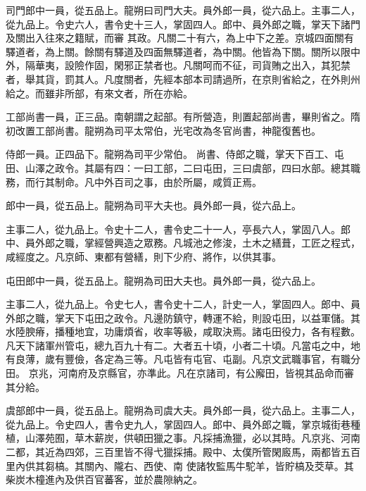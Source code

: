 \begin{pinyinscope}
 司門郎中一員，從五品上。龍朔曰司門大夫。員外郎一員，從六品上。主事二人，從九品上。令史六人，書令史十三人，掌固四人。郎中、員外郎之職，掌天下諸門及關出入往來之籍賦，而審
 其政。凡關二十有六，為上中下之差。京城四面關有驛道者，為上關。餘關有驛道及四面無驛道者，為中關。他皆為下關。關所以限中外，隔華夷，設險作固，閑邪正禁者也。凡關呵而不征，司貨賄之出入，其犯禁者，舉其貨，罰其人。凡度關者，先經本部本司請過所，在京則省給之，在外則州給之。而雖非所部，有來文者，所在亦給。



 工部尚書一員，正三品。南朝謂之起部。有所營造，則置起部尚書，畢則省之。隋初改置工部尚書。龍朔為司平太常伯，光宅改為冬官尚書，神龍復舊也。



 侍郎一員。正四品下。龍朔為司平少常伯。
 尚書、侍郎之職，掌天下百工、屯田、山澤之政令。其屬有四：一曰工部，二曰屯田，三曰虞部，四曰水部。總其職務，而行其制命。凡中外百司之事，由於所屬，咸質正焉。



 郎中一員，從五品上。龍朔為司平大夫也。員外郎一員，從六品上。



 主事二人，從九品上。令史十二人，書令史二十一人，亭長六人，掌固八人。郎中、員外郎之職，掌經營興造之眾務。凡城池之修浚，土木之繕葺，工匠之程式，咸經度之。凡京師、東都有營繕，則下少府、將作，以供其事。



 屯田郎中一員，從五品上。龍朔為司田大夫也。員外郎一員，從六品上。



 主事二人，從九品上。令史七人，書令史十二人，計史一人，掌固四人。郎中、員外郎之職，掌天下屯田之政令。凡邊防鎮守，轉運不給，則設屯田，以益軍儲。其水陸腴瘠，播種地宜，功庸煩省，收率等級，咸取決焉。諸屯田役力，各有程數。凡天下諸軍州管屯，總九百九十有二。大者五十頃，小者二十頃。凡當屯之中，地有良薄，歲有豐儉，各定為三等。凡屯皆有屯官、屯副。凡京文武職事官，有職分田。
 京兆，河南府及京縣官，亦準此。凡在京諸司，有公廨田，皆視其品命而審其分給。



 虞部郎中一員，從五品上。龍朔為司虞大夫。員外郎一員，從六品上。主事二人，從九品上。令史四人，書令史九人，掌固四人。郎中、員外郎之職，掌京城街巷種植，山澤苑囿，草木薪炭，供頓田獵之事。凡採捕漁獵，必以其時。凡京兆、河南二都，其近為四郊，三百里皆不得弋獵採捕。殿中、太僕所管閑廄馬，兩都皆五百里內供其芻槁。其關內、隴右、西使、南
 使諸牧監馬牛駝羊，皆貯槁及茭草。其柴炭木橦進內及供百官蕃客，並於農隙納之。




\end{pinyinscope}
